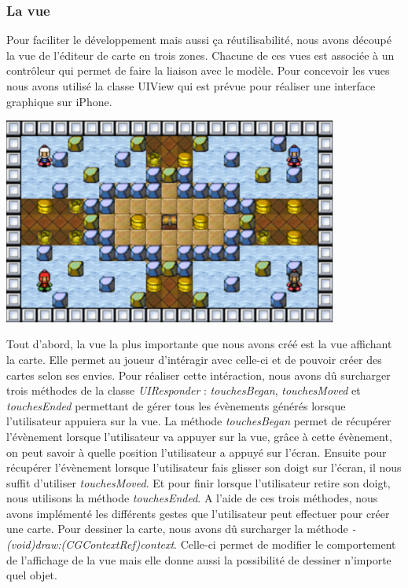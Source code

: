 	\subsubsection{La vue}
		Pour faciliter le développement mais aussi ça réutilisabilité, nous avons découpé la vue de l'éditeur de carte en trois zones. Chacune de ces vues est associée à un contrôleur qui permet de faire la liaison avec le modèle. Pour concevoir les vues nous avons utilisé la classe UIView qui est prévue pour réaliser une interface graphique sur iPhone. 
			
		\begin{center}
			\includegraphics[width=11cm]{./Developpement/Img/carte.eps}
		\end{center}
		Tout d'abord, la vue la plus importante que nous avons créé est la vue affichant la carte. Elle permet au joueur d'intéragir avec celle-ci et de pouvoir créer des cartes selon ses envies. Pour réaliser cette intéraction, nous avons dû surcharger trois méthodes de la classe \textit{UIResponder} : \textit{touchesBegan}, \textit{touchesMoved} et \textit{touchesEnded} permettant de gérer tous les évènements générés lorsque l'utilisateur appuiera sur la vue. La méthode \textit{touchesBegan} permet de récupérer l'évènement lorsque l'utilisateur va appuyer sur la vue, grâce à cette évènement, on peut savoir à quelle position l'utilisateur a appuyé sur l'écran. Ensuite pour récupérer l'évènement lorsque l'utilisateur fais glisser son doigt sur l'écran, il nous suffit d'utiliser \textit{touchesMoved}. Et pour finir lorsque l'utilisateur retire son doigt, nous utilisons la méthode \textit{touchesEnded}. A l'aide de ces trois méthodes, nous avons implémenté les différents gestes que l'utilisateur peut effectuer pour créer une carte. Pour dessiner la carte, nous avons dû surcharger la méthode \textit{- (void)draw:(CGContextRef)context}. Celle-ci permet de modifier le comportement de l'affichage de la vue mais elle donne aussi la possibilité de dessiner n'importe quel objet.
		
